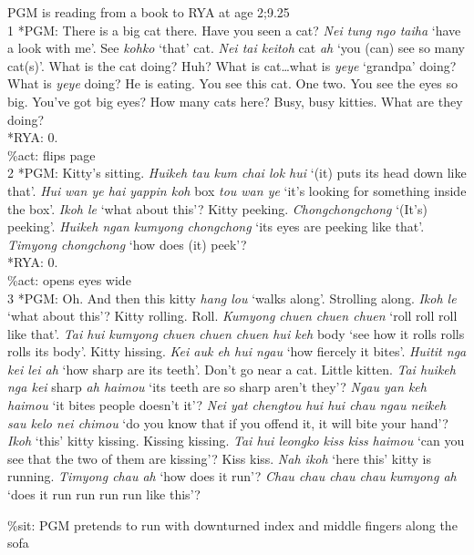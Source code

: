\documentclass[output=paper,colorlinks,citecolor=brown]{langscibook}
\begin{document}
\setcounter{equation}{0}
\ea%
    \label{ex:quay:1}
         PGM is reading from a book to RYA at age 2;9.25\\
1 *PGM:  There is a big cat there. Have you seen a cat? \textit{Nei tung ngo taiha} ‘have a look with me’. See \textit{kohko} ‘that’ cat. \textit{Nei tai keitoh} cat \textit{ah} ‘you (can) see so many cat(s)’. What is the cat doing? Huh? What is cat…what is \textit{yeye} ‘grandpa’ doing? What is \textit{yeye} doing? He is eating. You see this cat. One two. You see the eyes so big. You’ve got big eyes? How many cats here? Busy, busy kitties. What are they doing?\\
   *RYA:  0.\\
     \%act:  flips page\\
2 *PGM:  Kitty’s sitting. \textit{Huikeh tau kum chai lok hui} ‘(it) puts its head down like that’. \textit{Hui} \textit{wan ye hai yappin koh} box \textit{tou wan ye} ‘it’s looking for something inside the box’. \textit{Ikoh le} ‘what about this’? Kitty peeking. \textit{Chongchongchong} ‘(It’s) peeking’. \textit{Huikeh ngan kumyong chongchong} ‘its eyes are peeking like that’. \textit{Timyong chongchong} ‘how does (it) peek’?\\
   *RYA:  0.\\
     \%act:  opens eyes wide\\
3 *PGM:  Oh. And then this kitty \textit{hang lou} ‘walks along’. Strolling along. \textit{Ikoh le} ‘what about this’? Kitty rolling. Roll. \textit{Kumyong chuen chuen chuen} ‘roll roll roll like that’. \textit{Tai hui kumyong chuen chuen chuen hui keh} body ‘see how it rolls rolls rolls its body’. Kitty hissing. \textit{Kei auk eh hui ngau} ‘how fiercely it bites’. \textit{Huitit nga kei lei ah} ‘how sharp are its teeth’. Don’t go near a cat. Little kitten. \textit{Tai huikeh nga kei} sharp \textit{ah haimou} ‘its teeth are so sharp aren't they’? \textit{Ngau yan keh haimou} ‘it bites people doesn’t it’? \textit{Nei yat chengtou hui hui chau ngau neikeh sau kelo nei chimou} ‘do you know that if you offend it, it will bite your hand’? \textit{Ikoh} ‘this’ kitty kissing. Kissing kissing. \textit{Tai hui leongko} \textit{kiss kiss} \textit{haimou} ‘can you see that the two of them are kissing’? Kiss kiss. \textit{Nah ikoh} ‘here this’ kitty is running. \textit{Timyong chau ah} ‘how does it run’? \textit{Chau chau chau chau kumyong ah} ‘does it run run run run like this’?

    \%sit:  PGM pretends to run with downturned index and middle fingers along the sofa
\z
\end{document}
